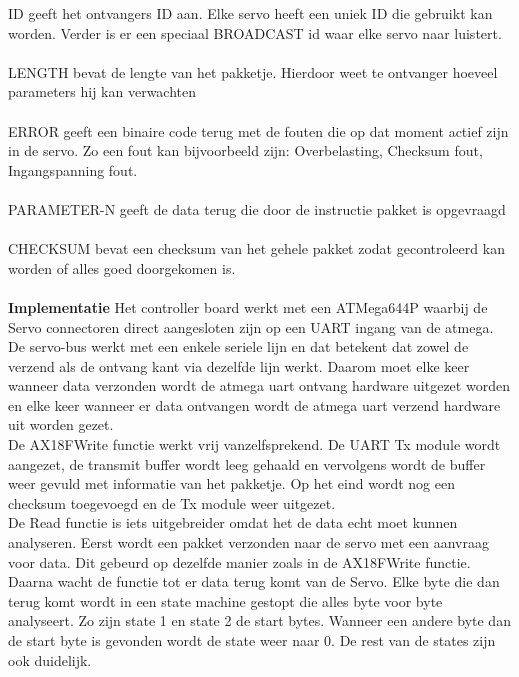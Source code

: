 \documentclass[10pt,a4paper]{article}
\begin{document}
ID geeft het ontvangers ID aan. Elke servo heeft een uniek ID die gebruikt kan worden. Verder is er een speciaal BROADCAST id waar elke servo naar luistert.\\\\
LENGTH bevat de lengte van het pakketje. Hierdoor weet te ontvanger hoeveel parameters hij kan verwachten\\\\
ERROR geeft een binaire code terug met de fouten die op dat moment actief zijn in de servo. Zo een fout kan bijvoorbeeld zijn: Overbelasting, Checksum fout, Ingangspanning fout.\\\\
PARAMETER-N geeft de data terug die door de instructie pakket is opgevraagd\\\\
CHECKSUM bevat een checksum van het gehele pakket zodat gecontroleerd kan worden of alles goed doorgekomen is.\\\\

\textbf{Implementatie}
Het controller board werkt met een ATMega644P waarbij de Servo connectoren direct aangesloten zijn op een UART ingang van de atmega. De servo-bus werkt met een enkele seriele lijn en dat betekent dat zowel de verzend als de ontvang kant via dezelfde lijn werkt. Daarom moet elke keer wanneer data verzonden wordt de atmega uart ontvang hardware uitgezet worden en elke keer wanneer er data ontvangen wordt de atmega uart verzend hardware uit worden gezet.\\
De AX18FWrite functie werkt vrij vanzelfsprekend. De UART Tx module wordt aangezet, de transmit buffer wordt leeg gehaald en vervolgens wordt de buffer weer gevuld met informatie van het pakketje. Op het eind wordt nog een checksum toegevoegd en de Tx module weer uitgezet.\\

De Read functie is iets uitgebreider omdat het de data echt moet kunnen analyseren. Eerst wordt een pakket verzonden naar de servo met een aanvraag voor data. Dit gebeurd op dezelfde manier zoals in de AX18FWrite functie. Daarna wacht de functie tot er data terug komt van de Servo. Elke byte die dan terug komt wordt in een state machine gestopt die alles byte voor byte analyseert. Zo zijn state 1 en state 2 de start bytes. Wanneer een andere byte dan de start byte is gevonden wordt de state weer naar 0. De rest van de states zijn ook duidelijk.
\end{document}
